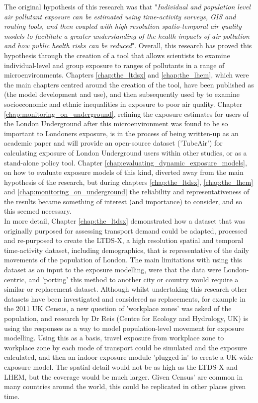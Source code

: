 
The original hypothesis of this research was that "\textit{Individual and population level air pollutant exposure can be estimated using time-activity surveys, GIS and routing tools, and then coupled with high resolution spatio-temporal air quality models to facilitate a greater understanding of the health impacts of air pollution and how public health risks can be reduced}". Overall, this research has proved this hypothesis through the creation of a tool that allows scientists to examine individual-level and group exposure to ranges of pollutants in a range of microenvironments. Chapters \ref{chap:the_ltdsx} and \ref{chap:the_lhem}, which were the main chapters centred around the creation of the tool, have been published as \cite{Smith2016} (the model development and use), and then subsequently used by \cite{Tonne2018} to examine socioeconomic and ethnic inequalities in exposure to poor air quality. Chapter \ref{chap:monitoring_on_underground}, refining the exposure estimates for users of the London Underground after this microenvironment was found to be so important to Londoners exposure, is in the process of being written-up as an academic paper and will provide an open-source dataset ('TubeAir') for calculating exposure of London Underground users within other studies, or as a stand-alone policy tool. Chapter \ref{chap:evaluating_dynamic_exposure_models}, on how to evaluate exposure models of this kind, diverted away from the main hypothesis of the research, but during chapters \ref{chap:the_ltdsx}, \ref{chap:the_lhem} and \ref{chap:monitoring_on_underground} the reliability and representativeness of the results became something of interest (and importance) to consider, and so this seemed necessary.\\

In more detail, Chapter \ref{chap:the_ltdsx} demonstrated how a dataset that was originally purposed for assessing transport demand could be adapted, processed and re-purposed to create the LTDS-X, a high resolution spatial and temporal time-activity dataset, including demographics, that is representative of the daily movements of the population of London. The main limitations with using this dataset as an input to the exposure modelling, were that the data were London-centric, and 'porting' this method to another city or country would require a similar or replacement dataset. Although whilst undertaking this research other datasets have been investigated and considered as replacements, for example in the 2011 UK Census, a new question of 'workplace zones' was asked of the population, and research by Dr Reis (Centre for Ecology and Hydrology, UK) is using the responses as a way to model population-level movement for exposure modelling. Using this as a basis, travel exposure from workplace zone to workplace zone by each mode of transport could be simulated and the exposure calculated, and then an indoor exposure module 'plugged-in' to create a UK-wide exposure model. The spatial detail would not be as high as the LTDS-X and LHEM, but the coverage would be much larger. Given Census' are common in many countries around the world, this could be replicated in other places given time.

